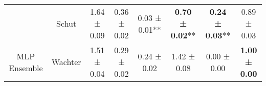 \begin{table}
{\begin{tabular}[t]{cccccccc}
 & Schut & 1.64 ± 0.09\hphantom{*}\hphantom{*} & 0.36 ± 0.02\hphantom{*}\hphantom{*} & 0.03 ± 0.01** & \textbf{0.70 ± 0.02}** & \textbf{0.24 ± 0.03}** & 0.89 ± 0.03\hphantom{*}\hphantom{*}\\

\multirow[t]{-9}{*}{\centering\arraybackslash MLP Ensemble} & Wachter & 1.51 ± 0.04\hphantom{*}\hphantom{*} & 0.29 ± 0.02\hphantom{*}\hphantom{*} & 0.24 ± 0.02\hphantom{*}\hphantom{*} & 1.42 ± 0.08\hphantom{*}\hphantom{*} & 0.00 ± 0.00\hphantom{*}\hphantom{*} & \textbf{1.00 ± 0.00}\hphantom{*}\hphantom{*}\\
\bottomrule
\end{tabular}}
\end{table}
